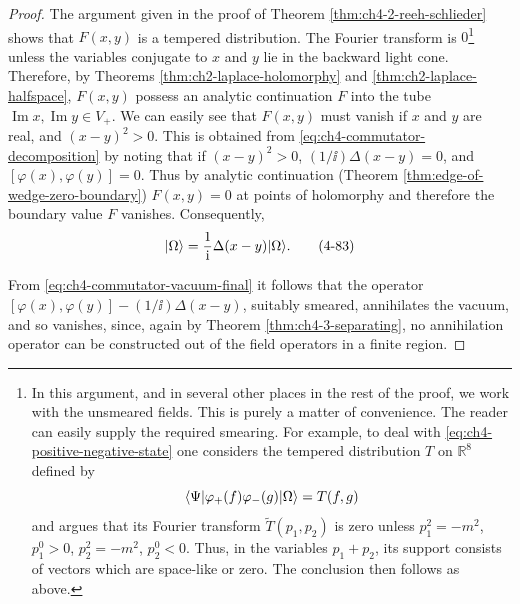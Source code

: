 \begin{proof}
The argument given in the proof of Theorem \ref{thm:ch4-2-reeh-schlieder} shows that $F(x,y)$ is a
tempered distribution.  The Fourier transform is $0$\footnote{%
In this argument, and in several other places in the rest of the proof, we
work with the unsmeared fields.  This is purely a matter of convenience.  The
reader can easily supply the required smearing.  For example, to deal with
\eqref{eq:ch4-positive-negative-state} one considers the tempered distribution $T$ on $\mathbb R^8$ defined
by
\[
  \langle \Psi\rvert\varphi_+(f)\varphi_-(g)\lvert \Omega\rangle=T(f,g)
\]
and argues that its Fourier transform $\widetilde T(p_1,p_2)$ is zero unless
$p_1^2=-m^2$, $p_1^0>0$, $p_2^2=-m^2$, $p_2^0<0$.  Thus, in the variables
$p_1+p_2$, its support consists of vectors which are space-like or zero.  The
conclusion then follows as above.}%
unless the variables conjugate to $x$ and $y$ lie in the backward light cone.
Therefore, by Theorems \ref{thm:ch2-laplace-holomorphy} and \ref{thm:ch2-laplace-halfspace}, $F(x,y)$ possess an analytic continuation
$F$ into the tube $\operatorname{Im}x,\operatorname{Im}y\in V_+$.  We can
easily see that $F(x,y)$ must vanish if $x$ and $y$ are real, and
$(x-y)^2>0$.  This is obtained from \eqref{eq:ch4-commutator-decomposition} by noting that if
$(x-y)^2>0$, $(1/\ii)\Delta(x-y)=0$, and
$[\varphi(x),\varphi(y)]=0$.  Thus by analytic continuation (Theorem \ref{thm:edge-of-wedge-zero-boundary})
$F(x,y)=0$ at points of holomorphy and therefore the boundary value $F$
vanishes.  Consequently,
\begin{equation}
  [\varphi(x),\varphi(y)]\ket{\Omega}
  =\frac{1}{\ii}\Delta(x-y)\ket{\Omega}.
  \tag{4-83}\label{eq:ch4-commutator-vacuum-final}
\end{equation}

From \eqref{eq:ch4-commutator-vacuum-final} it follows that the operator
$[\varphi(x),\varphi(y)]-(1/\ii)\Delta(x-y)$, suitably smeared,
annihilates the vacuum, and so vanishes, since, again by Theorem \ref{thm:ch4-3-separating}, no
annihilation operator can be constructed out of the field operators in a
finite region.


\end{proof}
